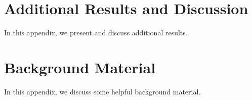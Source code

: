 \chapter{Additional Results and Discussion}

In this appendix, we present and discuss additional results.

\chapter{Background Material}

In this appendix, we discuss some helpful background material.
